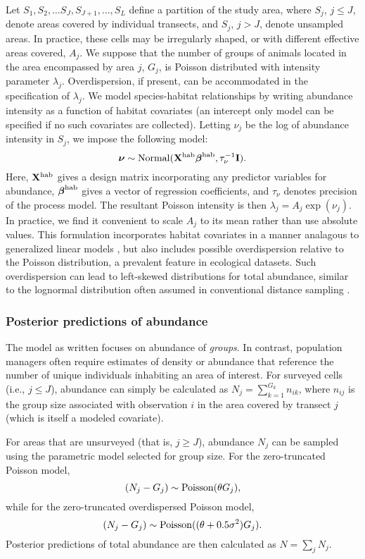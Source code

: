 \documentclass[10pt]{article}
\begin{document}
Let $S_1, S_2, \hdots S_J, S_{J+1}, \hdots, S_{L}$ define a partition of the study area, where $S_j$, $j \le J$, denote areas covered by individual transects, and $S_j$, $j>J$, denote unsampled areas.  In practice, these cells may be irregularly shaped, or with different effective areas covered, $A_j$.
We suppose that the number of groups of animals located in the area encompassed by area $j$, $G_j$, is Poisson distributed with intensity parameter $\lambda_j$.  Overdispersion, if present, can be accommodated in the specification of $\lambda_j$.
We model species-habitat relationships by writing abundance intensity as a function of habitat covariates (an intercept only model can be specified if no such covariates are collected).  Letting $\nu_j$ be the log of abundance intensity in $S_j$, we impose the following model:
$$
 \boldsymbol{\nu} \sim {\rm Normal}({\bf X}^{\rm hab}
 \boldsymbol{\beta}^{\rm hab},\tau_\nu^{-1}{\bf I}).
$$
Here, ${\bf X}^{\rm hab}$ gives a design matrix incorporating any predictor variables for abundance, $\boldsymbol{\beta}^{\rm hab}$ gives a vector of regression coefficients, and $\tau_\nu$ denotes precision of the process model.
The resultant Poisson intensity is then $\lambda_j=A_j \exp(\nu_j)$.  In practice, we find it convenient to scale $A_j$ to its mean rather than use absolute values.  This formulation incorporates habitat covariates in a manner analagous to generalized linear models \cite{McCullaghNelder1989}, but also includes possible overdispersion relative to the Poisson distribution, a prevalent feature in ecological datasets.  Such overdispersion can lead to left-skewed distributions for total abundance, similar to the lognormal distribution often assumed in conventional distance sampling \cite{BucklandEtAl2001}.

\subsubsection*{Posterior predictions of abundance}

The model as written focuses on abundance of \emph{groups}.  In contrast, population managers often require estimates of density or abundance that reference the number of unique individuals inhabiting an area of interest.  For surveyed cells (i.e., $j \le J$), abundance can simply be calculated as $N_j=\sum_{k=1}^{G_k} n_{ik}$, where $n_{ij}$ is the group size associated with observation $i$ in the area covered by transect $j$ (which is itself a modeled covariate).

For areas that are unsurveyed (that is, $j \ge J$), abundance $N_j$ can be sampled using the parametric model selected for group size.  For the zero-truncated Poisson model,
$$(N_j-G_j) \sim {\rm Poisson}(\theta G_j),
$$
while for the zero-truncated overdispersed Poisson model,
$$(N_j-G_j) \sim {\rm Poisson}((\theta+0.5\sigma^2) G_j).$$
Posterior predictions of total abundance are then calculated as $N=\sum_j N_j$.
\end{document}
